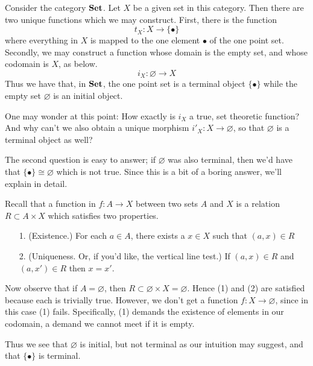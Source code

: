     \begin{example}
        Consider the category $\operatorname{\mathbf{Set}}$. Let $X$ be a given set in this category. 
        Then there are two unique functions which we may construct. First, there is the function 
        \[
            t_X: X \to \{\bullet\}
        \]
        where everything in $X$ is mapped to the one element $\bullet$ of the one point set. 
        Secondly, we may construct a function whose domain is the empty set, 
        and whose codomain is $X$, as below.
        \[
            i_X: \varnothing \to X
        \]
        Thus we have that, in $\operatorname{\mathbf{Set}}$, the one point set is a terminal 
        object $\{\bullet\}$ while the empty set
        $\varnothing$ is an initial object.
        
        One may wonder at this point: How exactly is $i_X$ a true, set theoretic function?
        And why can't we also obtain a unique morphism $i'_X: X \to \varnothing$, 
        so that $\varnothing$ is a terminal object as well?

        The second question is easy to answer; if $\varnothing$ was also terminal, then 
        we'd have that $\{\bullet\} \cong \varnothing$ which is not true. Since this is a bit of a boring 
        answer, we'll explain in detail.
        
        Recall that a function in $f: A \to X$ between two sets $A$ and 
        $X$ is a relation $R \subset A \times X$ which satisfies two properties. 
        \begin{itemize}
            \item[1.] (Existence.) For each $a \in A$, there exists a
            $x \in X$ such that $(a, x) \in R$ 
            \item[2.] (Uniqueness. Or, if you'd like, the vertical line test.) 
            If $(a, x) \in R$ and $(a, x') \in R$ then $x = x'$. 
        \end{itemize}
        Now observe that if $A = \varnothing$, then $R \subset \varnothing \times X = \varnothing$. 
        Hence (1) and (2) are satisfied because each is trivially true. However, we don't get 
        a function $f: X \to \varnothing$, since in this case (1) fails. Specifically, (1) demands 
        the existence of elements in our codomain, a demand we cannot meet if it is empty. 
        
        Thus we see that $\varnothing$ is initial, but not terminal as our intuition may suggest, 
        and that $\{\bullet\}$ is terminal.
    \end{example}


